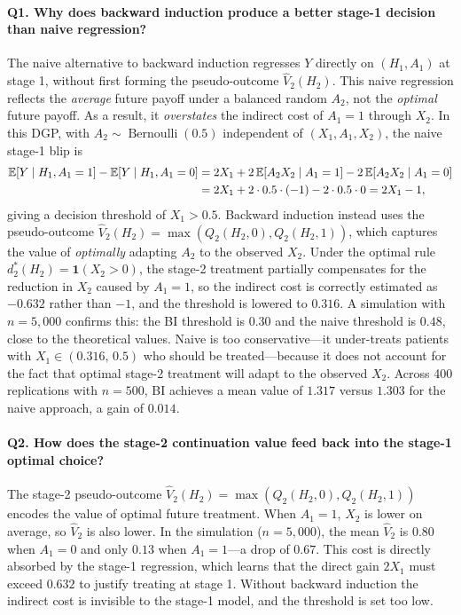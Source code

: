 \documentclass[master.tex]{subfiles}
\begin{document}
\paragraph{Q1. Why does backward induction produce a better stage-1 decision than naive regression?}
The naive alternative to backward induction regresses $Y$ directly on
$(H_1, A_1)$ at stage 1, without first forming the pseudo-outcome
$\widehat{V}_2(H_2)$.  This naive regression reflects the \emph{average}
future payoff under a balanced random $A_2$, not the \emph{optimal}
future payoff.  As a result, it \emph{overstates} the indirect cost of
$A_1 = 1$ through $X_2$.  In this DGP, with $A_2 \sim \operatorname{Bernoulli}(0.5)$
independent of $(X_1, A_1, X_2)$, the naive stage-1 blip is
\begin{align*}
  \mathbb{E}[Y \mid H_1, A_1=1] - \mathbb{E}[Y \mid H_1, A_1=0]
  &= 2X_1 + 2\,\mathbb{E}[A_2 X_2 \mid A_1=1]
     - 2\,\mathbb{E}[A_2 X_2 \mid A_1=0] \\
  &= 2X_1 + 2 \cdot 0.5 \cdot (-1) - 2 \cdot 0.5 \cdot 0
   = 2X_1 - 1,
\end{align*}
giving a decision threshold of $X_1 > 0.5$.
Backward induction instead uses the pseudo-outcome
$\widehat{V}_2(H_2) = \max(Q_2(H_2,0),Q_2(H_2,1))$, which captures the
value of \emph{optimally} adapting $A_2$ to the observed $X_2$.
Under the optimal rule $d_2^*(H_2) = \mathbf{1}(X_2 > 0)$, the stage-2
treatment partially compensates for the reduction in $X_2$ caused by
$A_1 = 1$, so the indirect cost is correctly estimated as $-0.632$
rather than $-1$, and the threshold is lowered to $0.316$.
A simulation with $n = 5{,}000$ confirms this: the BI threshold is $0.30$
and the naive threshold is $0.48$, close to the theoretical values.
Naive is too conservative---it under-treats patients with $X_1 \in
(0.316,\, 0.5)$ who should be treated---because it does not account for
the fact that optimal stage-2 treatment will adapt to the observed $X_2$.
Across 400 replications with $n = 500$, BI achieves a mean value of
$1.317$ versus $1.303$ for the naive approach, a gain of $0.014$.

\paragraph{Q2. How does the stage-2 continuation value feed back into the stage-1 optimal choice?}
The stage-2 pseudo-outcome $\widehat{V}_2(H_2) = \max(Q_2(H_2, 0),
Q_2(H_2, 1))$ encodes the value of optimal future treatment.  When
$A_1 = 1$, $X_2$ is lower on average, so $\widehat{V}_2$ is also lower.
In the simulation ($n = 5{,}000$), the mean $\widehat{V}_2$ is $0.80$ when
$A_1 = 0$ and only $0.13$ when $A_1 = 1$---a drop of $0.67$.  This cost
is directly absorbed by the stage-1 regression, which learns that the
direct gain $2X_1$ must exceed $0.632$ to justify treating at stage 1.
Without backward induction the indirect cost is invisible to the stage-1
model, and the threshold is set too low.
\end{document}
